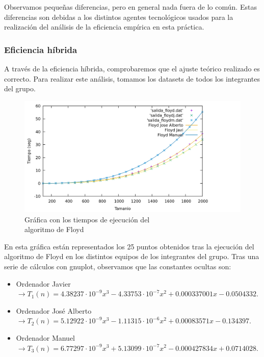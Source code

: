 \documentclass[10pt,a4paper]{article}
\begin{document}
Observamos pequeñas diferencias, pero en general nada fuera de lo común. Estas diferencias son debidas a los distintos agentes tecnológicos usados para la realización del análisis de la eficiencia empírica en esta práctica.

\subsubsection{Eficiencia híbrida}

A través de la eficiencia híbrida, comprobaremos que el ajuste teórico realizado es correcto. Para realizar este análisis, tomamos los datasets de todos los integrantes del grupo. \\

\begin{figure}[h!]
\centering
\includegraphics[scale=0.15]{../../Images/floyd_combinados.png}
\caption{Gráfica con los tiempos de ejecución del \\algoritmo de Floyd}
\end{figure}

\newpage

En esta gráfica están representados los 25 puntos obtenidos tras la ejecución del algoritmo de Floyd en los distintos equipos de los integrantes del grupo. Tras una serie de cálculos con gnuplot, observamos que las constantes ocultas son:
\begin{itemize}
	\item Ordenador Javier \(\rightarrow T_1(n) = 4.38237 \cdot 10^{-9} x^3 -4.33753 \cdot 10^{-7} x^2 + 0.000337001 x -0.0504332\).
	\item Ordenador José Alberto \(\rightarrow T_2(n) = 5.12922 \cdot 10^{-9} x^3 -1.11315 \cdot 10^{-6} x^2 + 0.00083571 x - 0.134397\).
	\item Ordenador Manuel \(\rightarrow T_3(n) = 6.77297 \cdot 10^{-9} x^3 + 5.13099 \cdot 10^{-7} x^2 - 0.000427834 x + 0.0714028\).
\end{itemize} 
\end{document}
